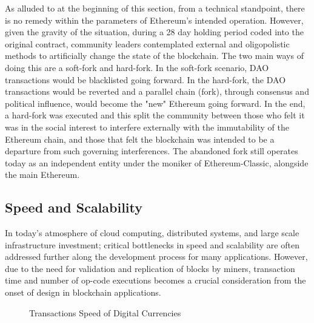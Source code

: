 As alluded to at the beginning of this section, from a technical standpoint, there
is no remedy within the parameters of Ethereum's intended operation. However, given
the gravity of the situation, during a 28 day holding period coded into the original
contract, community leaders contemplated external and oligopolistic methods to
artificially change the state of the blockchain. The two main ways of doing this
are a soft-fork and hard-fork. In the soft-fork scenario, DAO transactions would be
blacklisted going forward. In the hard-fork, the DAO transactions would be reverted and
a parallel chain (fork), through consensus and political influence, would become the
"new" Ethereum going forward. \cite{HardForkSoftFork} In the end, a hard-fork was
executed and this split the community between those who felt it was in the social
interest to interfere externally with the immutability of the Ethereum chain, and
those that felt the blockchain was intended to be a departure from such governing
interferences. The abandoned fork still operates today as an independent entity under
the moniker of Ethereum-Classic, alongside the main Ethereum. \cite{EthereumClassic}

\subsection{Speed and Scalability}

In today's atmosphere of cloud computing, distributed systems, and large scale
infrastructure investment; critical bottlenecks in speed and scalability are often
addressed further along the development process for many applications. However, due to
the need for validation and replication of blocks by miners, transaction time and number
of op-code executions becomes a crucial consideration from the onset of design in blockchain
applications.

\begin{figure}[]
\caption{Transactions Speed of Digital Currencies\cite{TransactionSpeed}}
\label{fig:transactionSpeedBar}
\end{figure}


